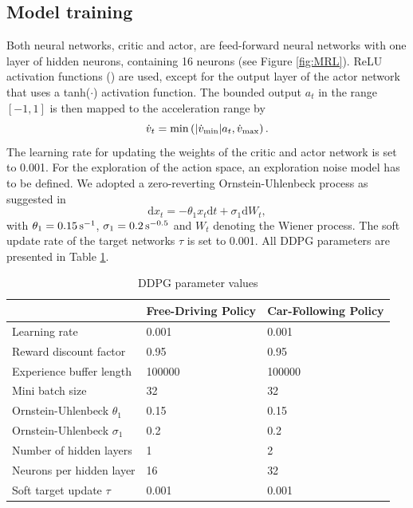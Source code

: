\documentclass[review]{elsarticle}
\providecommand{\sub}[1]{_{\mathrm{#1}}}  %
\providecommand{\3}{{\ss}}
\begin{document}
	\subsection{Model training}
	Both neural networks, critic and actor, are feed-forward neural
	networks with one layer of hidden neurons, containing 16 neurons (see
	Figure \ref{fig:MRL}). ReLU activation functions (\cite{relu}) are used, except for the output layer of the actor network that uses a tanh($\cdot$) activation function. The bounded output $a_t$ in the range $[-1,1]$ is then mapped to the acceleration range by
	\begin{equation}
		\dot{v}_t = \min \left( \abs{\dot{v}\sub{min}} a_t, \dot{v}\sub{max}\right).
	\end{equation}
	The learning rate for updating the weights of the critic and actor network is set to 0.001. For the exploration of the action space, an exploration noise model has to be defined. We adopted a
	zero-reverting Ornstein-Uhlenbeck process as suggested in \cite{DDPG}
	\begin{equation}
		\mathrm{d} x_{t}=-\theta_1 x_{t} \mathrm{d} t+\sigma_1 \mathrm{d} W_{t},
	\end{equation}
	with $\theta_1 = \unit[0.15]{s^{-1}}$, $\sigma_1 = \unit[0.2]{s^{-0.5}}$ and $W_{t}$ denoting the Wiener process.	
	The soft update rate of the target networks $\tau$ is set to
	0.001. All DDPG parameters are presented in Table \ref{tab:DDPGparameters}.
	\begin{table}
		\caption{DDPG parameter values} 
		\label{tab:DDPGparameters} 
		\begin{center}
			\begin{tabular}{ p{} p{0.2\textwidth}  p{} }
				& Free-Driving Policy & Car-Following Policy \\ \hline
				Learning rate & 0.001 & 0.001\\ 
				Reward discount factor & 0.95 & 0.95 \\ 
				Experience buffer length & 100000 & 100000 \\ 
				Mini batch size & 32 & 32 \\ 			
				Ornstein-Uhlenbeck  $\theta_1$ & 0.15& 0.15 \\ 
				Ornstein-Uhlenbeck  $\sigma_1$ & 0.2 & 0.2 \\				
				Number of hidden layers & 1 & 2\\
				Neurons per hidden layer & 16 & 32\\
				Soft target update  $\tau$ & 0.001 & 0.001\\
				
				
			\end{tabular}
		\end{center}
	\end{table}
\end{document}

